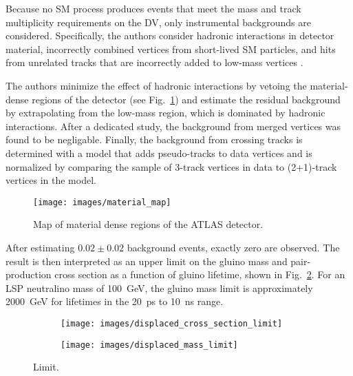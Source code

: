 \documentclass[12pt]{article}
\begin{document}
        Because no SM process produces events that meet the mass and track multiplicity requirements on the DV, only instrumental backgrounds are considered. Specifically, the authors consider hadronic interactions in detector material, incorrectly combined vertices from short-lived SM particles, and hits from unrelated tracks that are incorrectly added to low-mass vertices .

        The authors minimize the effect of hadronic interactions by vetoing the material-dense regions of the detector (see Fig.~\ref{material_map}) and estimate the residual background by extrapolating from the low-mass region, which is dominated by hadronic interactions. After a dedicated study, the background from merged vertices was found to be negligable. Finally, the background from crossing tracks is determined with a model that adds pseudo-tracks to data vertices and is normalized by comparing the sample of 3-track vertices in data to (2+1)-track vertices in the model.

        \noindent \begin{figure}[htbp] \begin{center}
        \texttt{[image: images/material\_map]}
            \caption{Map of material dense regions of the ATLAS detector.~\cite{atlas_displaced}}
        \label{material_map}
        \end{center} \end{figure}

        After estimating $\num{0.02} \pm \num{0.02}$ background events, exactly zero are observed. The result is then interpreted as an upper limit on the gluino mass and pair-production cross section as a function of gluino lifetime, shown in Fig.~\ref{displaced_limit}. For an LSP neutralino mass of \SI{100}{\giga\electronvolt}, the gluino mass limit is approximately \SI{2000}{\giga\electronvolt} for lifetimes in the \SI{20}{\pico\s} to \SI{10}{\nano\s} range.

        \noindent \begin{figure}[htbp] \begin{center}
        \begin{subfigure}[htbp]{0.45\textwidth} \begin{center}
        \texttt{[image: images/displaced\_cross\_section\_limit]}
        \end{center} \end{subfigure}
        \begin{subfigure}[htbp]{0.45\textwidth} \begin{center}
        \texttt{[image: images/displaced\_mass\_limit]}
        \end{center} \end{subfigure}
        \caption{Limit.~\cite{atlas_displaced}}
        \label{displaced_limit}
        \end{center} \end{figure}
\end{document}
